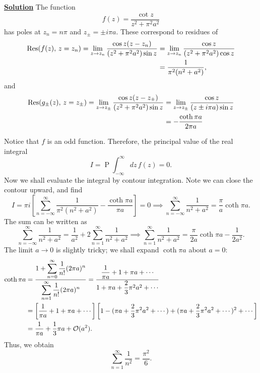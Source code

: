 \noindent \underline{\textbf{Solution}} The function
\begin{equation}
    f(z) = \frac{\cot z}{z^2+\pi^2 a^2}
\end{equation}
has poles at $z_n=n\pi$ and $z_\pm = \pm i\pi a$.  These correspond to residues of 
\begin{align}
    \operatorname{Res}(f(z), \, z=z_n) = \lim_{z\to z_n}\frac{\cos z(z-z_n)}{(z^2+\pi^2a^2)\sin z} &=  \lim_{z\to z_n}\frac{\cos z}{(z^2+\pi^2a^2)\cos z}\notag\\ &= \frac{1}{\pi^2(n^2+a^2)},
\end{align}
and
\begin{align}
    \operatorname{Res}(g_\pm(z), \, z=z_\pm) = \lim_{z\to z_\pm}\frac{\cos z(z-z_\pm)}{(z^2+\pi^2a^2)\sin z} &= \lim_{z\to z_\pm}\frac{\cos z}{(z\pm i\pi a)\sin z}\notag\\ &= -\frac{\coth \pi a}{ 2\pi a}
\end{align}

Notice that $f$ is an odd function. Therefore, the principal value of the real integral 
\begin{equation}
    I = \operatorname{P}\int^\infty_{-\infty} dz \, f(z)=0.
\end{equation}
Now we shall evaluate the integral by contour integration. Note we can close the contour upward, and find
\begin{equation}
    I = \pi i\left[\sum_{n=-\infty}^{\infty}\frac{1}{\pi^2(n^2 + a ^2)} -\frac{\coth \pi a}{ \pi a}\right] = 0 \implies \sum_{n=-\infty}^{\infty}\frac{1}{n^2 + a ^2} = \frac{\pi}{a}\coth \pi a.
\end{equation}
The sum can be written as
\begin{equation}
    \sum_{n=-\infty}^{\infty}\frac{1}{n^2 + a ^2} = \frac{1}{a^2} + 2 \sum_{n=1}^{\infty}\frac{1}{n^2 + a ^2} \implies \sum_{n=1}^{\infty}\frac{1}{n^2 + a ^2}  = \frac{\pi}{2a}\coth\pi a - \frac{1}{2a^2} .
\end{equation}
The limit $a\to0$ is slightly tricky; we shall expand $\coth \pi a$ about $a =0$:
\begin{align}
    \coth \pi a  &= \frac{1+\displaystyle\sum_{n=0}^\infty\frac{1}{n!}(2\pi a)^n}{\displaystyle\sum_{n=1}^\infty\frac{1}{n!}(2\pi a)^n} = \frac{\dfrac{1}{\pi a}+1 + \pi a + \cdots}{1+\pi a + \dfrac{2}{3}\pi^2 a^2+\cdots} \notag\\
    &=\left[\dfrac{1}{\pi a}+1 + \pi a + \cdots\right]\left[1-(\pi a + \dfrac{2}{3}\pi^2 a^2+\cdots) + (\pi a + \dfrac{2}{3}\pi^2 a^2+\cdots)^2 +\cdots\right]\notag\\ 
    &= \frac{1}{\pi a} +\frac{1}{3}\pi a + \mathcal{O}(a^2).
\end{align}
Thus, we obtain
\begin{equation}
    \sum_{n=1}^{\infty}\frac{1}{n^2} =\frac{\pi^2}{6}.
\end{equation}

